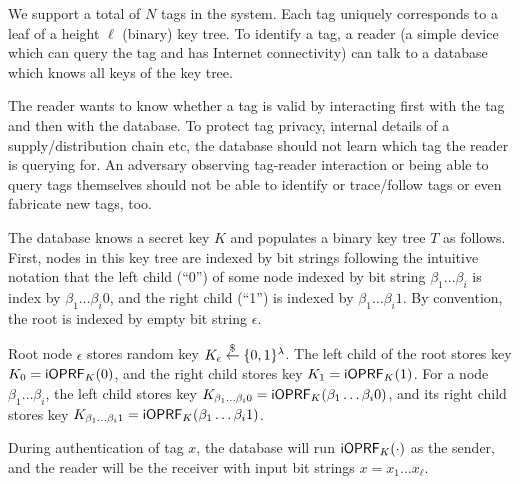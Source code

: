 We support a total of $N$ tags in the system. Each tag uniquely
corresponds to a leaf of a height $\ell$ (binary) key tree. To
identify a tag, a reader (a simple device which can query the tag and
has Internet connectivity) can talk to a database which knows all keys
of the key tree.

The reader wants to know whether a tag is valid by interacting first
with the tag and then with the database. To protect tag privacy,
internal details of a supply/distribution chain etc, the database
should not learn which tag the reader is querying for. An adversary
observing tag-reader interaction or being able to query tags
themselves should not be able to identify or trace/follow tags or
even fabricate new tags, too.


The database knows a secret key $K$ and populates a binary key tree
$T$ as follows. First, nodes in this key tree are indexed by bit
strings following the intuitive notation that the left child (``0'')
of some node indexed by bit string $\beta_1\ldots\beta_i$ is index by
$\beta_1\ldots\beta_i0$, and the right child (``1'') is indexed by
$\beta_1\ldots\beta_i1$. By convention, the root is indexed by
empty bit string $\epsilon$.

Root node $\epsilon$ stores random key
$K_{\epsilon}\stackrel{\$}{\leftarrow}\{0,1\}^\lambda$.  The left child of the root stores
key $K_0=\mathsf{i}\mathsf{OPRF}_K(0)$, and the right child stores key
$K_1=\mathsf{i}\mathsf{OPRF}_K(1)$. For a node $\beta_1\ldots\beta_i$,
the left child stores key
$K_{\beta_1\ldots\beta_i0}=\mathsf{i}\mathsf{OPRF}_K(\beta_1\ldots\beta_i0)$, and its
right child stores key
$K_{\beta_1\ldots\beta_i1}=\mathsf{i}\mathsf{OPRF}_K(\beta_1\ldots\beta_i1)$.

During authentication of tag $x$, the database will run
$\mathsf{i}\mathsf{OPRF}_K(\cdot)$ as the sender, and the reader will be the receiver
with input bit strings $x=x_1\ldots{}x_\ell$.

